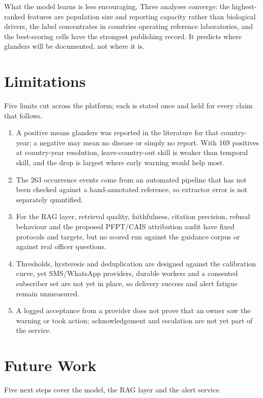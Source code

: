 \documentclass[10pt,openany]{report}
\begin{document}
What the model learns is less encouraging. Three analyses converge: the highest-ranked features are
population size and reporting capacity rather than biological drivers, the label concentrates in
countries operating reference laboratories, and the best-scoring cells have the strongest publishing
record. It predicts where glanders will be documented, not where it is.

\section{Limitations}
\label{sec:limitations}

Five limits cut across the platform; each is stated once and held for every claim that follows.

\begin{enumerate}
  \item A positive means glanders was reported in the literature for that country-year; a negative
        may mean no disease or simply no report. With 169 positives at country-year resolution,
        leave-country-out skill is weaker than temporal skill, and the drop is largest where early
        warning would help most.
  \item The 263 occurrence events come from an automated pipeline that has not been checked against
        a hand-annotated reference, so extractor error is not separately quantified.
  \item For the RAG layer, retrieval quality, faithfulness, citation precision, refusal behaviour and
        the proposed PFPT/CAIS attribution audit have fixed protocols and targets, but no scored run
        against the guidance corpus or against real officer questions.
  \item Thresholds, hysteresis and deduplication are designed against the calibration curve, yet
        SMS/WhatsApp providers, durable workers and a consented subscriber set are not yet in place,
        so delivery success and alert fatigue remain unmeasured.
  \item A logged acceptance from a provider does not prove that an owner saw the warning or took
        action; acknowledgement and escalation are not yet part of the service.
\end{enumerate}

\section{Future Work}

Five next steps cover the model, the RAG layer and the alert service.
\end{document}
